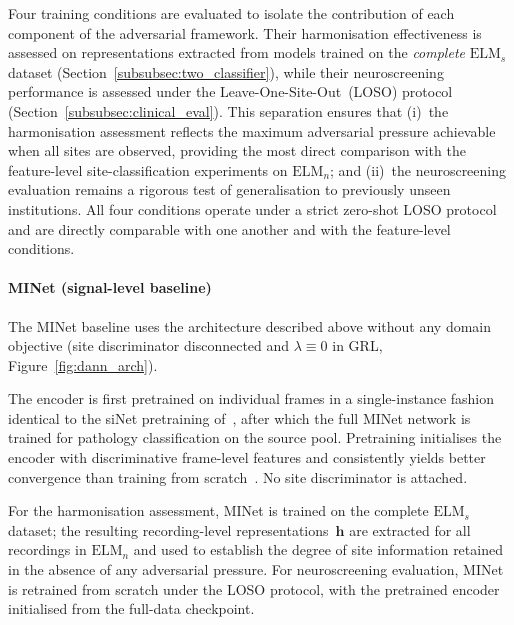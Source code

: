 \documentclass[preprint,12pt]{elsarticle}
\begin{document}
Four training conditions are evaluated to isolate the contribution of
each component of the adversarial framework.
Their harmonisation effectiveness is assessed on representations
extracted from models trained on the \emph{complete}
$\mathrm{ELM}_s$ dataset
(Section~\ref{subsubsec:two_classifier}), while their neuroscreening
performance is assessed under the Leave-One-Site-Out~(LOSO) protocol
(Section~\ref{subsubsec:clinical_eval}).
This separation ensures that (i)~the harmonisation assessment
reflects the maximum adversarial pressure achievable when all sites
are observed, providing the most direct comparison with the
feature-level site-classification experiments on $\mathrm{ELM}_n$;
and (ii)~the neuroscreening evaluation remains a rigorous test of
generalisation to previously unseen institutions.
All four conditions operate under a strict zero-shot LOSO protocol
and are directly comparable with one another and with the
feature-level conditions.

\paragraph{MINet (signal-level baseline)}
The MINet baseline uses the architecture described above without any
domain objective (site discriminator disconnected and $\lambda \equiv 0$ in GRL,  Figure~\ref{fig:dann_arch}).

The encoder is first pretrained on individual frames in a
single-instance fashion identical to the siNet pretraining
of~\cite{poziomska2026quantity}, after which the full MINet network
is trained for pathology classification on the source pool.
Pretraining initialises the encoder with discriminative frame-level
features and consistently yields better convergence than training
from scratch~\cite{poziomska2026quantity}.
No site discriminator is attached.

For the harmonisation assessment, MINet is trained on the complete
$\mathrm{ELM}_s$ dataset; the resulting recording-level
representations~$\mathbf{h}$ are extracted for all recordings in
$\mathrm{ELM}_n$ and used to establish the degree of site information
retained in the absence of any adversarial pressure.
For neuroscreening evaluation, MINet is retrained from scratch under
the LOSO protocol, with the pretrained encoder initialised from the
full-data checkpoint.
\end{document}
